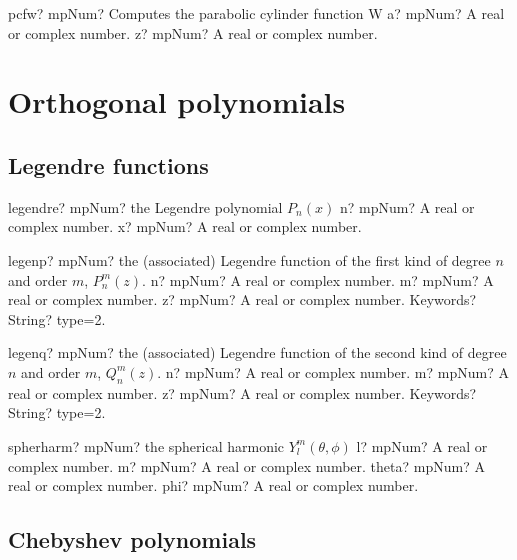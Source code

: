 \documentclass[12pt,a4paper,openany]{book}
\begin{document}
\begin{mpFunctionsExtract}
\mpFunctionTwo
{pcfw? mpNum? Computes the parabolic cylinder function W}
{a? mpNum? A real or complex number.}
{z? mpNum? A real or complex number.}
\end{mpFunctionsExtract}

\chapter{Orthogonal polynomials}

\section{Legendre functions}

\begin{mpFunctionsExtract}
\mpFunctionTwo
{legendre? mpNum? the Legendre polynomial $P_n(x)$}
{n? mpNum? A real or complex number.}
{x? mpNum? A real or complex number.}
\end{mpFunctionsExtract}

\begin{mpFunctionsExtract}
\mpFunctionFour
{legenp? mpNum? the (associated) Legendre function of the first kind of degree $n$ and order $m$, $P_n^m(z)$.}
{n? mpNum? A real or complex number.}
{m? mpNum? A real or complex number.}
{z? mpNum? A real or complex number.}
{Keywords? String? type=2.}
\end{mpFunctionsExtract}

\begin{mpFunctionsExtract}
\mpFunctionFour
{legenq? mpNum? the (associated) Legendre function of the second kind of degree $n$ and order $m$, $Q_n^m(z)$.}
{n? mpNum? A real or complex number.}
{m? mpNum? A real or complex number.}
{z? mpNum? A real or complex number.}
{Keywords? String? type=2.}
\end{mpFunctionsExtract}

\begin{mpFunctionsExtract}
\mpFunctionFour
{spherharm? mpNum? the spherical harmonic $Y_l^m(\theta,\phi)$}
{l? mpNum? A real or complex number.}
{m? mpNum? A real or complex number.}
{theta? mpNum? A real or complex number.}
{phi? mpNum? A real or complex number.}
\end{mpFunctionsExtract}

\section{Chebyshev polynomials}
\end{document}

